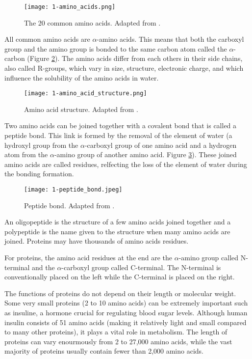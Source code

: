 \begin{figure}
  \centering
  \texttt{[image: 1-amino\_acids.png]}
  \caption{The 20 common amino acids. Adapted from \citeauthor{BYJUsAminoAcids}.}
  \label{fig:20aa}
\end{figure}

All common amino acids are $\alpha$-amino acids. This means that both the carboxyl group and the amino group
is bonded to the same carbon atom called the $\alpha$-carbon (Figure \ref{fig:aastructure}). The amino acids differ from each others in
their side chains, also called R-groups, which vary in size, structure, electronic charge, and which
influence the solubility of the amino acids in water.

\begin{figure}
  \centering
  \texttt{[image: 1-amino\_acid\_structure.png]}
  \caption{Amino acid structure. Adapted from \citeauthor{BYJUsAminoAcidsStructure}.}
  \label{fig:aastructure}
\end{figure}

Two amino acids can be joined together with a covalent bond that is called a peptide bond. This link
is formed by the removal of the element of water (a hydroxyl group from the $\alpha$-carboxyl group
of one amino acid and a hydrogen atom from the $\alpha$-amino group of another amino acid. Figure 
\ref{fig:peptidebond}). These joined amino acids are called residues, relfecting the loss of the element
of water during the bonding formation.

\begin{figure}
  \centering
  \texttt{[image: 1-peptide\_bond.jpeg]}
  \caption{Peptide bond. Adapted from \citeauthor{ChemistryLearnerPeptideBond}.}
  \label{fig:peptidebond}
\end{figure}

An oligopeptide is the structure of a few amino acids joined together and a polypeptide is the name
given to the structure when many amino acids are joined. Proteins may have thousands of amino acids residues.

For proteins, the amino acid residues at the end are the $\alpha$-amino group called N-terminal and 
the $\alpha$-carboxyl group called C-terminal. The N-terminal is conventionally placed on the left while
the C-terminal is placed on the right.

The functions of proteins do not depend on their length or molecular weight. \cite{Alberts2002ProteinFunction} Some very small proteins 
(2 to 10 amino acids) can be extremely important such as insuline, a hormone crucial for regulating blood sugar levels. 
Although human insulin consists of 51 amino acids (making it relatively light and small compared to many other proteins), 
it plays a vital role in metabolism. \cite{Steiner1985} The length of proteins can vary enourmously 
from 2 to 27,000 amino acids, while the vast majority of proteins usually contain fewer than 2,000 amino acids.

